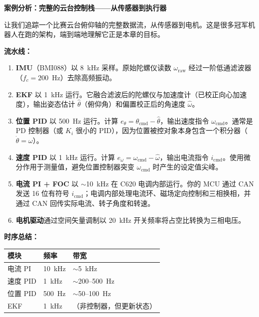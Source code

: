 \vspace{0.5em}
\begin{mdframed}[linewidth=1pt, innertopmargin=10pt, innerbottommargin=10pt]
\textbf{案例分析：完整的云台控制栈——从传感器到执行器}

\vspace{0.3em}
让我们追踪一个比赛云台俯仰轴的完整数据流，从传感器到电机。这是很多冠军机器人在跑的架构，端到端地理解它正是本章的目标。

\textbf{流水线：}

\begin{enumerate}[nosep]
    \item \textbf{IMU}（BMI088）以 8~kHz 采样。原始陀螺仪读数 $\omega_{\text{raw}}$ 经过一阶低通滤波器（$f_c = 200$~Hz）去除高频振动。
    \item \textbf{EKF} 以 1~kHz 运行。它融合滤波后的陀螺仪与加速度计（已校正向心加速度），输出姿态估计 $\hat{\theta}$（俯仰角）和偏置校正后的角速度 $\hat{\omega}$。
    \item \textbf{位置 PID} 以 500~Hz 运行。计算 $e_\theta = \theta_{\text{cmd}} - \hat{\theta}$，输出速度指令 $\omega_{\text{cmd}}$。通常是 PD 控制器（或 $K_i$ 很小的 PID），因为位置被控对象本身包含一个积分器（$\dot{\theta} = \omega$）。
    \item \textbf{速度 PID} 以 1~kHz 运行。计算 $e_\omega = \omega_{\text{cmd}} - \hat{\omega}$，输出电流指令 $i_{\text{cmd}}$。使用微分作用于测量值，避免位置控制器突变 $\omega_{\text{cmd}}$ 时产生的设定值尖峰。
    \item \textbf{电流 PI + FOC} 以 $\sim$10~kHz 在 C620 电调内部运行。你的 MCU 通过 CAN 发送 16 位有符号 $i_{\text{cmd}}$；电调内部处理电流环、磁场定向控制和三相换相，并通过 CAN 回传实际电流、转子角度和转速。
    \item \textbf{电机驱动}通过空间矢量调制以 20~kHz 开关频率将占空比转换为三相电压。
\end{enumerate}

\textbf{时序总结：}
\begin{center}
\begin{tabular}{l l l}
\hline
\textbf{模块} & \textbf{频率} & \textbf{带宽} \\
\hline
电流 PI & 10~kHz & $\sim$5~kHz \\
速度 PID & 1~kHz & $\sim$200--500~Hz \\
位置 PID & 500~Hz & $\sim$50--100~Hz \\
EKF & 1~kHz & （非控制器，但更新状态） \\
\hline
\end{tabular}
\end{center}


\end{mdframed}
